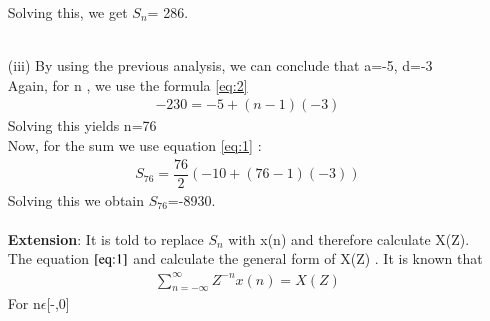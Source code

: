 \documentclass[journal,12pt,twocolumn]{IEEEtran}
\theoremstyle{remark}
\begin{document}
\begin{enumerate}
 Solving this, we get $S_n$= 286.\\\\

\item[(iii)]  
\vspace{0.5cm}
By using the previous analysis, we can conclude that a=-5, d=-3\\
Again, for n , we use the formula \eqref{eq:2}
\begin{align}
-230= -5+(n-1)(-3)
\end{align}
Solving this yields n=76\\
Now, for the sum we use equation \eqref{eq:1} :\\
\begin{align}
    S_{76}=\dfrac{76}{2}(-10+(76-1)(-3))
    \end{align}
Solving this we obtain $S_{76}$=-8930.\\\\
\textbf{Extension}:
It is told to replace $S_n$ with x(n) and therefore calculate X(Z). The equation $\eqref{eq:1}$ and calculate the general form of X(Z) .
It is known that\\
\begin{align}
 \sum_{n=-\infty}^{\infty} Z^{-n}x(n) = X(Z)\label{eq:3}
 \end{align}
For n$\epsilon$[-\infty,0] 


\end{enumerate}
\end{document}
